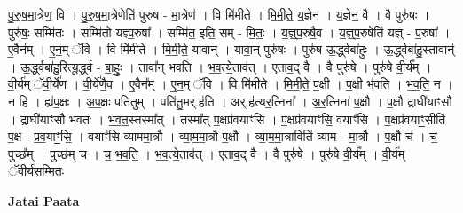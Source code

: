 \documentclass[17pt]{extarticle}
\begin{document}
पु॒रु॒ष॒मा॒त्रेण॒ वि । पु॒रु॒ष॒मा॒त्रेणेति॑ पुरुष - मा॒त्रेण॑ । वि मि॑मीते । मि॒मी॒ते॒ य॒ज्ञेन॑ । य॒ज्ञेन॒ वै । वै पुरु॑षः । पुरु॑षः॒ सम्मि॑तः । सम्मि॑तो यज्ञ्प॒रुषा᳚ । सम्मि॑त॒ इति॒ सम् - मि॒तः॒ । य॒ज्ञ्॒प॒रुषै॒व । य॒ज्ञ्॒प॒रुषेति॑ यज्ञ् - प॒रुषा᳚ । ए॒वैन᳚म् । ए॒न॒म् ॅवि । वि मि॑मीते । मि॒मी॒ते॒ यावान्॑ । यावा॒न् पुरु॑षः । पुरु॑ष ऊ॒र्द्ध्वबा॑हुः । ऊ॒र्द्ध्वबा॑हु॒स्तावान्॑ । ऊ॒र्द्ध्वबा॑हु॒रित्यू॒र्द्ध्व - बा॒हुः॒ । तावा᳚न् भवति । भ॒व॒त्ये॒ताव॑त् । ए॒ताव॒द् वै । वै पुरु॑षे । पुरु॑षे वी॒र्य᳚म् । वी॒र्य॑म् ॅवी॒र्ये॑ण । वी॒र्ये॑णै॒व । ए॒वैन᳚म् । ए॒न॒म् ॅवि । वि मि॑मीते । मि॒मी॒ते॒ प॒क्षी । प॒क्षी भ॑वति । भ॒व॒ति॒ न । न हि । ह्य॑प॒क्षः । अ॒प॒क्षः पति॑तुम् । पति॑तु॒मर्.ह॑ति । अर्.ह॑त्यर॒त्निना᳚ । अ॒र॒त्निना॑ प॒क्षौ । प॒क्षौ द्राघी॑याꣳसौ । द्राघी॑याꣳसौ भवतः । भ॒व॒त॒स्तस्मा᳚त् । तस्मा᳚त् प॒क्षप्र॑वयाꣳसि । प॒क्षप्र॑वयाꣳसि॒ वयाꣳ॑सि । प॒क्षप्र॑वयाꣳ॒॒सीति॑ प॒क्ष - प्र॒व॒याꣳ॒॒सि॒ । वयाꣳ॑सि व्याममा॒त्रौ । व्या॒म॒मा॒त्रौ प॒क्षौ । व्या॒म॒मा॒त्राविति॑ व्याम - मा॒त्रौ । प॒क्षौ च॑ । च॒ पुच्छ᳚म् । पुच्छ॑म् च । च॒ भ॒व॒ति॒ । भ॒व॒त्ये॒ताव॑त् । ए॒ताव॒द् वै । वै पुरु॑षे । पुरु॑षे वी॒र्य᳚म् । वी॒र्य॑म् ॅवी॒र्य॑सम्मितः \newline

\textbf{Jatai Paata} \newline
\end{document}
